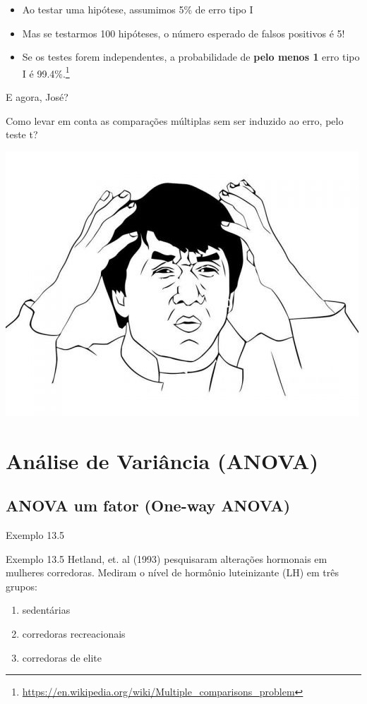 \documentclass{beamer}
\begin{document}
\begin{frame}{}
  \begin{itemize}
    \small
  \item Ao testar uma hipótese, assumimos 5\% de erro tipo I
    \bigskip
    \bigskip
  \item Mas se testarmos 100 hipóteses, o número esperado de falsos positivos é 5!
  \item Se os testes forem independentes, a probabilidade de {\bf pelo menos 1} erro tipo I é 99.4\%.\footnote{\tiny \url{https://en.wikipedia.org/wiki/Multiple_comparisons_problem}}
  \end{itemize}
\end{frame}

\begin{frame}{E agora, José?}
  \begin{block}{}
    Como levar em conta as comparações múltiplas sem ser induzido ao erro, pelo teste t?
  \end{block}
  \bigskip
  \begin{center}
    \includegraphics[width=.4\textwidth]{Cap10-11/Jackie-Chan-WTF}
  \end{center}
\end{frame}


\section[ANOVA]{Análise de Variância (ANOVA)}

\subsection{ANOVA um fator (One-way ANOVA)}

\begin{frame}[label=exemplo13.5-enunciado]{\small Exemplo 13.5}
  \begin{exampleblock}{Exemplo 13.5}
    \small
    Hetland, et. al (1993) pesquisaram alterações hormonais em mulheres corredoras.
    Mediram o nível de hormônio luteinizante (LH) em três grupos:
    \bigskip
    \begin{enumerate}
      \small
    \item sedentárias
    \item corredoras recreacionais
    \item corredoras de elite
    \end{enumerate}
  \end{exampleblock}
\end{frame}
\end{document}
